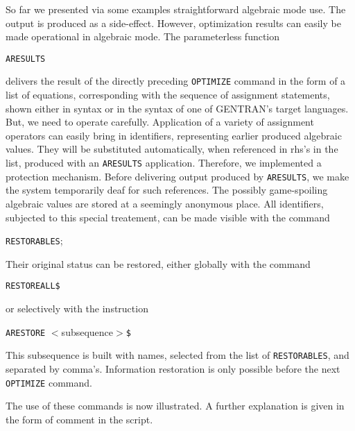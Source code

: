 So far we presented via some examples straightforward
algebraic mode use. The output is produced as a side-effect. However,
optimization results can easily be made operational in algebraic mode.
The parameterless function

\hspace*{1cm} {\tt ARESULTS}

delivers the result of the directly
preceding {\tt OPTIMIZE} command in the form of a list of equations,
corresponding with the sequence of assignment statements, shown either in
{\REDUCE} syntax or in the syntax of one of GENTRAN's target languages.
But, we need to operate carefully. Application of a variety of assignment
operators can easily bring in identifiers, representing earlier produced
algebraic values. They will be substituted automatically, when referenced in
rhs's in the list, produced with an {\tt ARESULTS} application.
Therefore, we implemented a
protection mechanism. Before delivering output produced by {\tt ARESULTS},
we make the system temporarily deaf for such references. The
possibly game-spoiling algebraic values are stored at a seemingly
anonymous place. All
identifiers, subjected to this special treatement, can be made visible with
the command

\hspace*{1cm} {\tt RESTORABLES};

Their original status can be restored, either globally with the command

\hspace*{1cm} {\tt RESTOREALL}\verb+$+

or selectively with the instruction

\hspace*{1cm} {\tt ARESTORE} $<$subsequence$>$\verb+$+

This subsequence is built with names, selected  from the list
of {\tt RESTORABLES}, and separated by comma's. Information restoration
is only possible before the next {\tt OPTIMIZE} command.

\example\label{ex:3.1.9}

The use of these commands is now illustrated.
A further explanation is given in the form of comment in the script.

